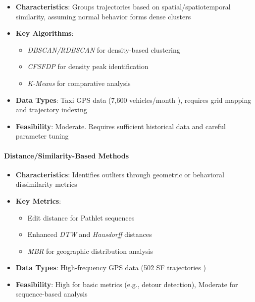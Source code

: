 \documentclass[runningheads]{llncs}
\newcommand{\term}[1]{\textit{#1}}
\begin{document}
\begin{itemize}[label=•]
\item \textbf{Characteristics}: Groups trajectories based on spatial/spatiotemporal similarity, assuming normal behavior forms dense clusters
\item \textbf{Key Algorithms}: 
  \begin{itemize}[label=--]
  \item \term{DBSCAN/RDBSCAN} for density-based clustering \cite{he2019based,hu2019based}
  \item \term{CFSFDP} for density peak identification \cite{he2019based}
  \item \term{K-Means} for comparative analysis \cite{han2016anomaly}
  \end{itemize}
\item \textbf{Data Types}: Taxi GPS data (7,600 vehicles/month \cite{zhang2011ibat}), requires grid mapping and trajectory indexing
\item \textbf{Feasibility}: Moderate. Requires sufficient historical data and careful parameter tuning \cite{hu2019based}
\end{itemize}

\paragraph{Distance/Similarity-Based Methods}
\label{par:distance-methods}

\begin{itemize}[label=•]
\item \textbf{Characteristics}: Identifies outliers through geometric or behavioral dissimilarity metrics
\item \textbf{Key Metrics}:
  \begin{itemize}[label=--]
  \item Edit distance for Pathlet sequences \cite{han2016anomaly}
  \item Enhanced \term{DTW} and \term{Hausdorff} distances \cite{he2019based}
  \item \term{MBR} for geographic distribution analysis \cite{he2019based}
  \end{itemize}
\item \textbf{Data Types}: High-frequency GPS data (502 SF trajectories \cite{hu2019based})
\item \textbf{Feasibility}: High for basic metrics (e.g., detour detection), Moderate for sequence-based analysis \cite{he2019based}
\end{itemize}
\end{document}
